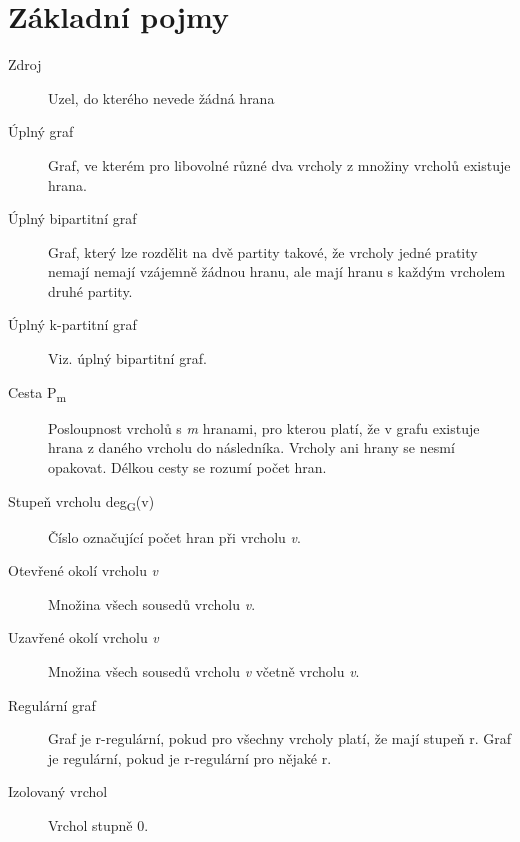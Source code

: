 \section{Základní pojmy}

  \begin{description}
    \item[Zdroj] Uzel, do kterého nevede žádná hrana
    \item[Úplný graf] Graf, ve kterém pro libovolné různé dva vrcholy z množiny vrcholů existuje hrana.
    \item[Úplný bipartitní graf] Graf, který lze rozdělit na dvě partity takové, že vrcholy jedné pratity nemají nemají vzájemně žádnou hranu, ale mají hranu s každým vrcholem druhé partity.
    \item[Úplný k-partitní graf] Viz. úplný bipartitní graf.
    \item[Cesta P\textsubscript{m}] Posloupnost vrcholů s \emph{m} hranami, pro kterou platí, že v grafu existuje hrana z daného vrcholu do následníka. Vrcholy ani hrany se nesmí opakovat. Délkou cesty se rozumí počet hran.
    \item[Stupeň vrcholu deg\textsubscript{G}(v)] Číslo označující počet hran při vrcholu \emph{v}.
    \item[Otevřené okolí vrcholu \emph{v}] Množina všech sousedů vrcholu \emph{v}.
    \item[Uzavřené okolí vrcholu \emph{v}] Množina všech sousedů vrcholu \emph{v} včetně vrcholu \emph{v}.
    \item[Regulární graf] Graf je r-regulární, pokud pro všechny vrcholy platí, že mají stupeň r. Graf je regulární, pokud je r-regulární pro nějaké r.
    \item[Izolovaný vrchol] Vrchol stupně 0.
  \end{description}
